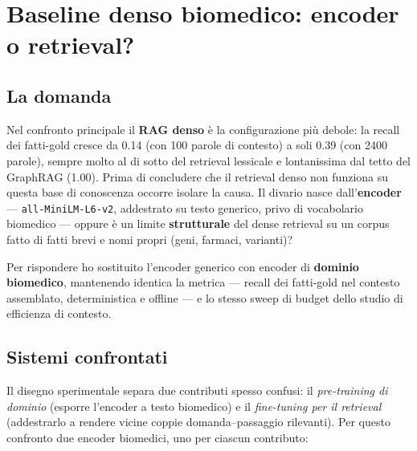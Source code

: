 \documentclass[11pt,a4paper]{report}
\begin{document}

\chapter{Baseline denso biomedico: encoder o retrieval?}
\label{ch:baseline-denso-biomedico}

\section{La domanda}

Nel confronto principale il \textbf{RAG denso} è la configurazione più
debole: la recall dei fatti-gold cresce da \num{0,14} (con \num{100} parole di
contesto) a soli \num{0,39} (con \num{2400} parole), sempre molto al di sotto
del retrieval lessicale e lontanissima dal tetto del GraphRAG (\num{1,00}).
Prima di concludere che \guillemotleft{}il retrieval denso non funziona su questa base di
conoscenza\guillemotright{} occorre isolare la causa. Il divario nasce dall'\textbf{encoder}
--- \texttt{all-MiniLM-L6-v2}, addestrato su testo generico, privo di
vocabolario biomedico --- oppure è un limite \textbf{strutturale} del dense
retrieval su un corpus fatto di fatti brevi e nomi propri (geni, farmaci,
varianti)?

Per rispondere ho sostituito l'encoder generico con encoder di
\textbf{dominio biomedico}, mantenendo identica la metrica --- recall dei
fatti-gold nel contesto assemblato, deterministica e offline --- e lo stesso
sweep di budget dello studio di efficienza di contesto.

\section{Sistemi confrontati}

Il disegno sperimentale separa due contributi spesso confusi: il
\emph{pre-training di dominio} (esporre l'encoder a testo biomedico) e il
\emph{fine-tuning per il retrieval} (addestrarlo a rendere vicine coppie
domanda--passaggio rilevanti). Per questo confronto due encoder biomedici, uno
per ciascun contributo:
\end{document}
